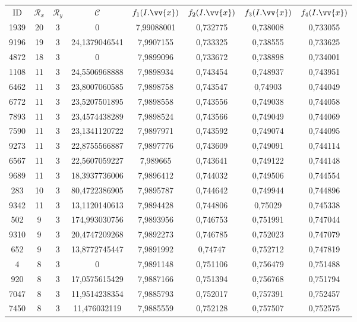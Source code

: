 \scriptsize
\begin{longtable}{|c|c|c|c|c|c|c|c|}
\hline
ID & $\mathscr{R}_x$ & $\mathscr{R}_y$ & $\mathscr{C}$ & $f_1(I.\vv{x})$ & $f_2(I.\vv{x})$ & $f_3(I.\vv{x})$ & $f_4(I.\vv{x})$ \\
1939 & 20 & 3 & 0 & 7,99088001 & 0,732775 & 0,738008 & 0,733055 \\
9196 & 19 & 3 & 24,1379046541 & 7,9907155 & 0,733325 & 0,738555 & 0,733625 \\
4872 & 18 & 3 & 0 & 7,9899096 & 0,733672 & 0,738898 & 0,734001 \\
1108 & 11 & 3 & 24,5506968888 & 7,9898934 & 0,743454 & 0,748937 & 0,743951 \\
6462 & 11 & 3 & 23,8007060585 & 7,9898758 & 0,743547 & 0,74903 & 0,744049 \\
6772 & 11 & 3 & 23,5207501895 & 7,9898558 & 0,743556 & 0,749038 & 0,744058 \\
7893 & 11 & 3 & 23,4574438289 & 7,9898524 & 0,743566 & 0,749049 & 0,744069 \\
7590 & 11 & 3 & 23,1341120722 & 7,9897971 & 0,743592 & 0,749074 & 0,744095 \\
9273 & 11 & 3 & 22,8755566887 & 7,9897776 & 0,743609 & 0,749091 & 0,744114 \\
6567 & 11 & 3 & 22,5607059227 & 7,989665 & 0,743641 & 0,749122 & 0,744148 \\
9689 & 11 & 3 & 18,3937736006 & 7,9896412 & 0,744032 & 0,749506 & 0,744554 \\
283 & 10 & 3 & 80,4722386905 & 7,9895787 & 0,744642 & 0,749944 & 0,744896 \\
9342 & 11 & 3 & 13,1120140613 & 7,9894428 & 0,744806 & 0,75029 & 0,745338 \\
502 & 9 & 3 & 174,993030756 & 7,9893956 & 0,746753 & 0,751991 & 0,747044 \\
9310 & 9 & 3 & 20,4747209268 & 7,9892273 & 0,746785 & 0,752023 & 0,747079 \\
652 & 9 & 3 & 13,8772745447 & 7,9891992 & 0,74747 & 0,752712 & 0,747819 \\
4 & 8 & 3 & 0 & 7,9891148 & 0,751106 & 0,756479 & 0,751488 \\
920 & 8 & 3 & 17,0575615429 & 7,9887166 & 0,751394 & 0,756768 & 0,751794 \\
7047 & 8 & 3 & 11,9514238354 & 7,9885793 & 0,752017 & 0,757391 & 0,752457 \\
7450 & 8 & 3 & 11,476032119 & 7,9885559 & 0,752128 & 0,757507 & 0,752575 \\

\end{longtable}
